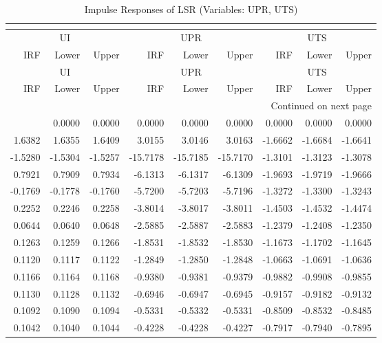 \begin{longtable}{rrrrrrrrr}
\caption{Impulse Responses of LSR (Variables: UPR, UTS)}\\
\label{tab:lsr_irf_group2}\\
\toprule
\multicolumn{3}{c}{UI} & \multicolumn{3}{c}{UPR} & \multicolumn{3}{c}{UTS} \\
IRF & Lower & Upper & IRF & Lower & Upper & IRF & Lower & Upper \\
\midrule
\endfirsthead
\toprule
\multicolumn{3}{c}{UI} & \multicolumn{3}{c}{UPR} & \multicolumn{3}{c}{UTS} \\
IRF & Lower & Upper & IRF & Lower & Upper & IRF & Lower & Upper \\
\midrule
\endhead
\midrule
\multicolumn{9}{r}{Continued on next page} \\
\midrule
\endfoot
\bottomrule
\endlastfoot
0.0000 & 0.0000 & 0.0000 & 0.0000 & 0.0000 & 0.0000 & 0.0000 & 0.0000 & 0.0000 \\
1.6382 & 1.6355 & 1.6409 & 3.0155 & 3.0146 & 3.0163 & -1.6662 & -1.6684 & -1.6641 \\
-1.5280 & -1.5304 & -1.5257 & -15.7178 & -15.7185 & -15.7170 & -1.3101 & -1.3123 & -1.3078 \\
0.7921 & 0.7909 & 0.7934 & -6.1313 & -6.1317 & -6.1309 & -1.9693 & -1.9719 & -1.9666 \\
-0.1769 & -0.1778 & -0.1760 & -5.7200 & -5.7203 & -5.7196 & -1.3272 & -1.3300 & -1.3243 \\
0.2252 & 0.2246 & 0.2258 & -3.8014 & -3.8017 & -3.8011 & -1.4503 & -1.4532 & -1.4474 \\
0.0644 & 0.0640 & 0.0648 & -2.5885 & -2.5887 & -2.5883 & -1.2379 & -1.2408 & -1.2350 \\
0.1263 & 0.1259 & 0.1266 & -1.8531 & -1.8532 & -1.8530 & -1.1673 & -1.1702 & -1.1645 \\
0.1120 & 0.1117 & 0.1122 & -1.2849 & -1.2850 & -1.2848 & -1.0663 & -1.0691 & -1.0636 \\
0.1166 & 0.1164 & 0.1168 & -0.9380 & -0.9381 & -0.9379 & -0.9882 & -0.9908 & -0.9855 \\
0.1130 & 0.1128 & 0.1132 & -0.6946 & -0.6947 & -0.6945 & -0.9157 & -0.9182 & -0.9132 \\
0.1092 & 0.1090 & 0.1094 & -0.5331 & -0.5332 & -0.5331 & -0.8509 & -0.8532 & -0.8485 \\
0.1042 & 0.1040 & 0.1044 & -0.4228 & -0.4228 & -0.4227 & -0.7917 & -0.7940 & -0.7895 \\
\end{longtable}